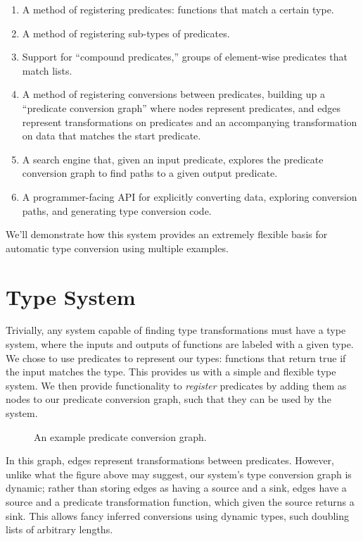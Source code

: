 \documentclass[letterpaper]{article}
\begin{document}
\begin{enumerate}
  \item A method of registering predicates: functions that match a certain type.
  \item A method of registering sub-types of predicates.
  \item Support for ``compound predicates,'' groups of element-wise predicates that match lists.
  \item A method of registering conversions between predicates, building up a ``predicate conversion graph'' where nodes represent predicates, and edges represent transformations on predicates and an accompanying transformation on data that matches the start predicate.
  \item A search engine that, given an input predicate, explores the predicate conversion graph to find paths to a given output predicate.
  \item A programmer-facing API for explicitly converting data, exploring conversion paths, and generating type conversion code.
\end{enumerate}

We'll demonstrate how this system provides an extremely flexible basis for automatic type conversion using multiple examples.

\section{Type System}

Trivially, any system capable of finding type transformations must have a type system, where the inputs and outputs of functions are labeled with a given type.  We chose to use predicates to represent our types: functions that return true if the input matches the type.  This provides us with a simple and flexible type system.  We then provide functionality to \textit{register} predicates by adding them as nodes to our predicate conversion graph, such that they can be used by the system.

\begin{figure}[h!]
\centering

\caption{An example predicate conversion graph.}
\label{graph}
\end{figure}

In this graph, edges represent transformations between predicates.  However, unlike what the figure above may suggest, our system's type conversion graph is dynamic; rather than storing edges as having a source and a sink, edges have a source and a predicate transformation function, which given the source returns a sink.  This allows fancy inferred conversions using dynamic types, such doubling lists of arbitrary lengths.
\end{document}

